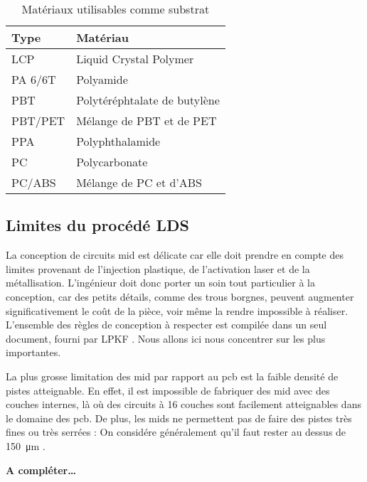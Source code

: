 \begin{table}[h]
\centering
\begin{tabular}{l l}
\toprule 
Type & Matériau \\
\midrule %
LCP & Liquid Crystal Polymer \\
PA 6/6T & Polyamide \\
PBT & Polytéréphtalate de butylène \\
PBT/PET & Mélange de PBT et de PET \\
PPA & Polyphthalamide \\
PC & Polycarbonate \\
PC/ABS & Mélange de PC et d'ABS \\ 
\bottomrule 
\end{tabular}
\caption{Matériaux utilisables comme substrat}
\label{tab:mid-materials}
\end{table}

\subsection{Limites du procédé LDS}
La conception de circuits \gls{mid} est délicate car elle doit prendre en compte des limites provenant de l'injection plastique, de l'activation laser et de la métallisation.
L'ingénieur doit donc porter un soin tout particulier à la conception, car des petits détails, comme des trous borgnes, peuvent augmenter significativement le coût de la pièce, voir même la rendre impossible à réaliser.
L'ensemble des règles de conception à respecter est compilée dans un seul document, fourni par LPKF \cite{mid-design-rules}.
Nous allons ici nous concentrer sur les plus importantes.

La plus grosse limitation des \gls{mid} par rapport au \gls{pcb} est la faible densité de pistes atteignable.
En effet, il est impossible de fabriquer des \gls{mid} avec des couches internes, là où des circuits à 16 couches sont facilement atteignables dans le domaine des \gls{pcb}.
De plus, les \glspl{mid} ne permettent pas de faire des pistes très fines ou très serrées : On considére généralement qu'il faut rester au dessus de \SI{150}{\micro\meter} .

\textbf{A compléter\ldots}


